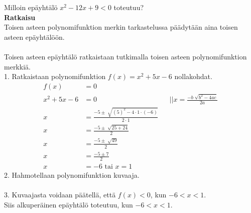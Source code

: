 \begin{esimerkki} 
Milloin epäyhtälö $x^2-12x+9<0$ toteutuu? \\ 
\textbf{Ratkaisu} \\
Toisen asteen polynomifunktion merkin tarkastelussa päädytään aina toisen asteen epäyhtälöön. \\ \\
Toisen asteen epäyhtälö ratkaistaan tutkimalla toisen asteen polynomifunktion merkkiä.  \\
1. Ratkaistaan polynomifunktion $f(x)=x^2+5x-6$ nollakohdat.
\begin{align*}
f(x)&=0 \\
x^2+5x-6&=0 \ \  \ \ \ &&||x=\frac{-b \sqrt[]{b^2-4ac}}{2a} \\ 
x&=\frac{-5 \pm \sqrt[]{(5)^2-4 \cdot 1 \cdot(-6)}}{2 \cdot 1} \\
x&=\frac{-5 \pm \sqrt[]{25+24}}{2} \\
x&=\frac{-5 \pm \sqrt[]{49}}{2} \\
x&=\frac{-5 \pm 7}{2} \\
x&=-6 \text{ tai } x=1
\end{align*}
2. Hahmotellaan polynomifunktion kuvaaja. \\ 
 \\
3.  Kuvaajasta voidaan päätellä, että $f(x)<0$, kun $-6 < x < 1$.  \\
Siis alkuperäinen epäyhtälö toteutuu, kun $-6 < x <1$.  
\end{esimerkki}
